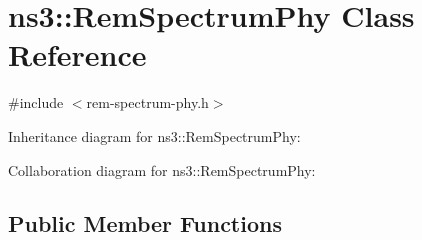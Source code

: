 \hypertarget{classns3_1_1RemSpectrumPhy}{}\section{ns3\+:\+:Rem\+Spectrum\+Phy Class Reference}
\label{classns3_1_1RemSpectrumPhy}


{\ttfamily \#include $<$rem-\/spectrum-\/phy.\+h$>$}



Inheritance diagram for ns3\+:\+:Rem\+Spectrum\+Phy\+:


Collaboration diagram for ns3\+:\+:Rem\+Spectrum\+Phy\+:
\subsection*{Public Member Functions}
